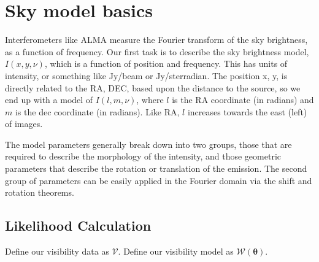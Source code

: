 \documentclass[modern]{aastex62}
\begin{document}

\section{Sky model basics}
Interferometers like ALMA measure the Fourier transform of the sky brightness, as a function of frequency. Our first task is to describe the sky brightness model, $I(x, y, \nu)$, which is a function of position and frequency. This has units of intensity, or something like Jy/beam or Jy/sterradian. The position x, y, is directly related to the RA, DEC, based upon the distance to the source, so we end up with a model of $I(l, m, \nu)$, where $l$ is the RA coordinate (in radians) and $m$ is the dec coordinate (in radians). Like RA, $l$ increases towards the east (left) of images.

The model parameters generally break down into two groups, those that are required to describe the morphology of the intensity, and those geometric parameters that describe the rotation or translation of the emission. The second group of parameters can be easily applied in the Fourier domain via the shift and rotation theorems.

\subsection{Likelihood Calculation}

Define our visibility data as $\boldsymbol{\mathcal{V}}$.
Define our visibility model as $\boldsymbol{\mathcal{W}}(\boldsymbol{\theta})$.
\end{document}
